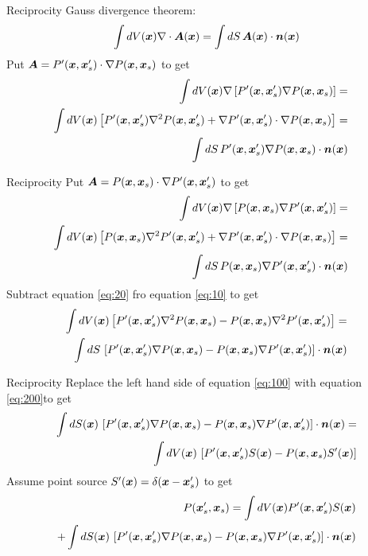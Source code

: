 \documentclass[xcolor=dvipsnames,notes]{beamer}
\begin{document}
\begin{frame}{Reciprocity}
Gauss divergence theorem:
\begin{eqnarray}
 \int dV(\mbox{\boldmath $x$}) \nabla \cdot \mbox{\boldmath $A$}(\mbox{\boldmath $x$}) =
 \int dS\, \mbox{\boldmath $A$}(\mbox{\boldmath $x$}) \cdot \mbox{\boldmath $n$}(\mbox{\boldmath $x$}) 
\end{eqnarray}
Put $\mbox{\boldmath $A$} = P'(\mbox{\boldmath $x$},\mbox{\boldmath $x$}'_s) \cdot \nabla P(\mbox{\boldmath $x$},\mbox{\boldmath $x$}_s)$ to get
\begin{eqnarray}
 \int dV(\xx) \nabla\left[P'(\xx,\xx'_s)\nabla P(\xx,\xx_s)\right]= &&\nonumber\\   
 \int dV(\xx) \left[P'(\xx,\xx'_s)\nabla^2 P(\xx,\xx'_s) + \nabla P'(\xx,\xx'_s)\cdot\nabla P(\xx,\xx_s)\right] = &&\nonumber\\
 \int dS\, P'(\xx,\xx'_s)\nabla P(\xx,\xx_s)\cdot \nn(\xx)&& 
                     \label{eq:10}
\end{eqnarray}
\end{frame}
\begin{frame}{Reciprocity}
Put $\mbox{\boldmath $A$} = P(\mbox{\boldmath $x$},\mbox{\boldmath $x$}_s) \cdot \nabla P'(\mbox{\boldmath $x$},\mbox{\boldmath $x$}'_s)$ to get
\begin{eqnarray}
 \int dV(\xx) \nabla\left[P(\xx,\xx_s)\nabla P'(\xx,\xx'_s)\right]= &&\nonumber\\   
 \int dV(\xx) \left[P(\xx,\xx_s)\nabla^2 P'(\xx,\xx'_s) + \nabla P'(\xx,\xx'_s)\cdot\nabla P(\xx,\xx_s)\right] = &&\nonumber\\
 \int dS\, P(\xx,\xx_s)\nabla P'(\xx,\xx'_s)\cdot \nn(\xx)&& 
                     \label{eq:20}
\end{eqnarray}
Subtract equation \eqref{eq:20} fro equation \eqref{eq:10} to get
\begin{eqnarray}
 \int dV(\xx) \left[P'(\xx,\xx'_s)\nabla^2 P(\xx,\xx_s) -  P(\xx,\xx_s)\nabla^2 P'(\xx,\xx'_s)\right]= \nonumber\\
 \int dS\, \left[P'(\xx,\xx'_s)\nabla P(\xx,\xx_s) - P(\xx,\xx_s)\nabla P'(\xx,\xx'_s)\right]\cdot \nn(\xx)
       \label{eq:200}
\end{eqnarray}
\end{frame}
\begin{frame}{Reciprocity}
Replace the left hand side of equation \eqref{eq:100} with equation \eqref{eq:200}to get
\begin{eqnarray}
\int dS(\xx)\, \left[P'(\xx,\xx'_s)\nabla P(\xx,\xx_s)-P(\xx,\xx_s)\nabla P'(\xx,\xx'_s)\right]\cdot \nn(\xx) = \nonumber\\
       \int dV(\xx)\, \left[P'(\xx,\xx'_s)S(\xx) -P(\xx,\xx_s)S'(\xx)\right]
                   \label{eq:300}
\end{eqnarray}
Assume point source $S'(\mbox{\boldmath $x$}) = \delta(\mbox{\boldmath $x$}-\mbox{\boldmath $x$}'_s)$
to get
\begin{eqnarray}
   P(\mbox{\boldmath $x$}'_s,\mbox{\boldmath $x$}_s) = \int dV(\mbox{\boldmath $x$}) P'(\mbox{\boldmath $x$},\mbox{\boldmath $x$}'_s)S(\mbox{\boldmath $x$}) \nonumber\\
               +\int dS(\mbox{\boldmath $x$})\, \left[P'(\mbox{\boldmath $x$},\mbox{\boldmath $x$}'_s)\nabla P(\mbox{\boldmath $x$},\mbox{\boldmath $x$}_s)-
              P(\mbox{\boldmath $x$},\mbox{\boldmath $x$}_s)\nabla P'(\mbox{\boldmath $x$},\mbox{\boldmath $x$}'_s)\right]\cdot \mbox{\boldmath $n$}(\mbox{\boldmath $x$}) \label{eq:320}
\end{eqnarray}
\end{frame}
\end{document}
